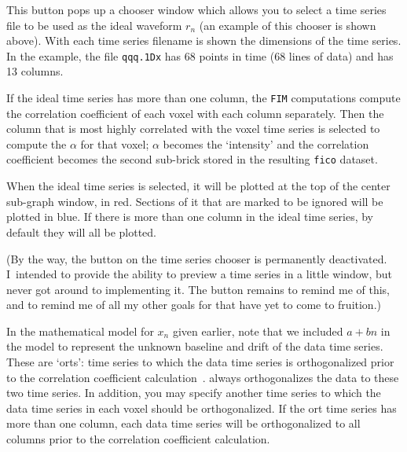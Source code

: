 \begin{description}\vspace*{-3.2ex}
   This button pops up a chooser window which allows you
                     to select a time series file to be used as the
                     ideal waveform $r_n$
                     (an example of this chooser is shown above).
                     With each time series filename is shown the
                     dimensions of the time series.  In the example,
                     the file {\tt qqq.1Dx} has 68 points in time (68 lines of data)
                     and has 13 columns.

                     If the ideal time series has more than one column, the
                     {\tt FIM} computations compute the correlation coefficient
                     of each voxel with each column separately.  Then the
                     column that is most highly correlated with the voxel
                     time series is selected to compute the $\alpha$ for
                     that voxel;  $\alpha$ becomes the `intensity' and
                     the correlation coefficient becomes the second sub-brick
                     stored in the resulting {\tt fico} dataset.

                     When the ideal time series is selected, it will be plotted
                     at the top of the center sub-graph window, in red.
                     Sections of it that are marked to be ignored will
                     be plotted in blue.  If there is more than one
                     column in the ideal time series, by default they will all
                     be plotted.

                     (By the way, the  button on the time series
                      chooser is permanently deactivated.  I~intended to
                      provide the ability to preview a time series in a little
                      window, but never got around to implementing it.
                      The button remains to remind me of this, and to remind me
                      of all my other goals for \afnit that have yet to come to fruition.)

    In the mathematical model for $x_n$ given earlier, note
                    that we included $a + b n$ in the model to represent
                    the unknown baseline and drift of the data time series.
                    These are `orts': time series to which the data time series
                    is orthogonalized prior to the correlation coefficient
                    calculation~\cite{Cox-Rtime}.  \afnit always orthogonalizes
                    the data to these two time series.  In addition, you
                    may specify another time series to which the data time
                    series in each voxel should be orthogonalized.
                    If the ort time series has more than one column, each
                    data time series will be orthogonalized to all columns
                    prior to the correlation coefficient calculation.


\end{description}
